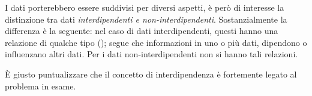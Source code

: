 \documentclass{subfiles}
\begin{document}
I dati porterebbero essere suddivisi per diversi aspetti, è però di interesse la distinzione tra dati \emph{interdipendenti \emph{e} non-interdipendenti}.
Sostanzialmente la differenza è la seguente: nel caso di dati interdipendenti, questi hanno una relazione di qualche tipo ();
segue che informazioni in uno o più dati, dipendono o influenzano altri dati. Per i dati non-interdipendenti non si hanno tali relazioni.

\begin{Remark*}
    \`E giusto puntualizzare che il concetto di interdipendenza è fortemente legato al problema in esame.
\end{Remark*}
\end{document}
